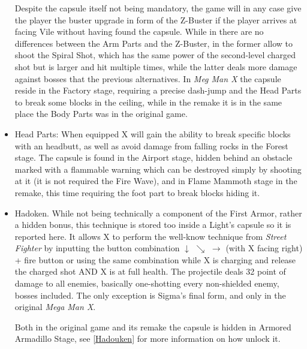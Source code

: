 \begin{itemize}
	Despite the capsule itself not being mandatory, the game will in any case give the player the buster upgrade in form of the Z-Buster if the player arrives at facing Vile without having found the capsule. While in \x there are no differences between the Arm Parts and the Z-Buster, in \mhx the former allow to shoot the Spiral Shot, which has the same power of the second-level charged shot but is larger and hit multiple times, while the latter deals more damage against bosses that the previous alternatives. In \textit{Meg Man X} the capsule reside in the Factory stage, requiring a precise dash-jump and the Head Parts to break some blocks in the ceiling, while in the remake it is in the same place the Body Parts was in the original game.
	
	\item Head Parts: When equipped X will gain the ability to break specific blocks with an headbutt, as well as avoid damage from falling rocks in the Forest stage. The capsule is found in the Airport stage, hidden behind an obstacle marked with a flammable warning which can be destroyed simply by shooting at it (it is not required the Fire Wave), and in Flame Mammoth stage in the remake, this time requiring the foot part to break blocks hiding it.
	
	\item Hadoken. While not being technically a component of the First Armor, rather a hidden bonus, this technique is stored too inside a Light's capsule so it is reported here. It allows X to perform the well-know technique from \textit{Street Fighter} by inputting the button combination $\downarrow$ $\searrow$ $\rightarrow$ (with X facing right) + fire button or using the same combination while X is charging and release the charged shot\cite{RTA_wiki:X1}  AND X is at full health. The projectile deals 32 point of damage\cite{wiki:Hadoken} to all enemies, basically one-shotting every non-shielded enemy, bosses included. The only exception is Sigma's final form, and only in the original \textit{Mega Man X}. 
	
	Both in the original game and its remake the capsule is hidden in Armored Armadillo Stage, see \ref{Hadouken} for more information on how unlock it.
\end{itemize}

